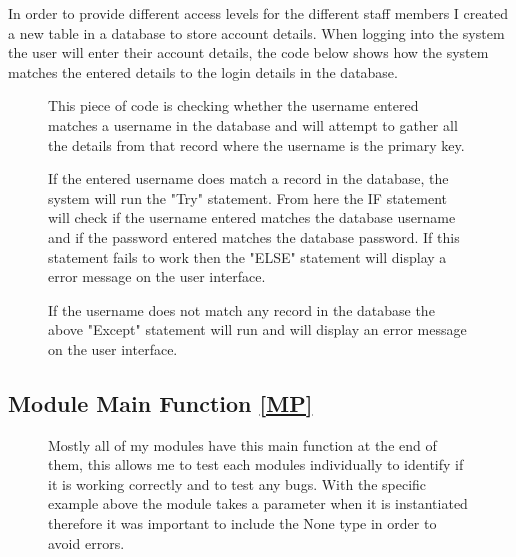 In order to provide different access levels for the different staff members I created a new table in a database to store account details. When logging into the system the user will enter their account details, the code below shows how the system matches the entered details to the login details in the database.

 \begin{figure}[H]
    \caption{This piece of code is checking whether the username entered matches a username in the database and will attempt to gather all the details from that record where the username is the primary key.}\label{fig:Dialog Class}
\end{figure}

 \begin{figure}[H]
    \caption{If the entered username does match a record in the database, the system will run the "Try" statement. From here the IF statement will check if the username entered matches the database username and if the password entered matches the database password. If this statement fails to work then the "ELSE" statement will display a error message on the user interface.}\label{fig:Dialog Class}
\end{figure}

 \begin{figure}[H]
    \caption{If the username does not match any record in the database the above "Except" statement will run and will display an error message on the user interface. }\label{fig:Dialog Class}
\end{figure}

\subsection{Module Main Function \ref{MP}}
 
 \begin{figure}[H]
    \caption{Mostly all of my modules have this main function at the end of them, this allows me to test each modules individually to identify if it is working correctly and to test any bugs. With the specific example above the module takes a parameter when it is instantiated therefore it was important to include the None type in order to avoid errors.} \label{fig:Dialog Class}
\end{figure}

